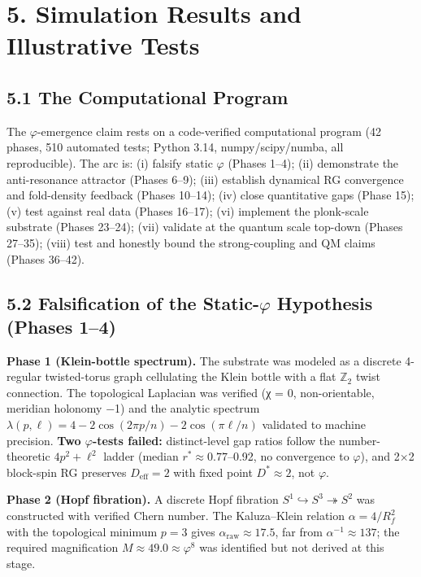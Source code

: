 \documentclass[
  11pt,
]{article}
\begin{document}
\section{5. Simulation Results and Illustrative
Tests}\label{simulation-results-and-illustrative-tests}

\subsection{5.1 The Computational
Program}\label{the-computational-program}

The \(\varphi\)-emergence claim rests on a code-verified computational
program (42 phases, 510 automated tests; Python 3.14, numpy/scipy/numba,
all reproducible). The arc is: (i) falsify static \(\varphi\) (Phases
1--4); (ii) demonstrate the anti-resonance attractor (Phases 6--9);
(iii) establish dynamical RG convergence and fold-density feedback
(Phases 10--14); (iv) close quantitative gaps (Phase 15); (v) test
against real data (Phases 16--17); (vi) implement the plonk-scale
substrate (Phases 23--24); (vii) validate at the quantum scale top-down
(Phases 27--35); (viii) test and honestly bound the strong-coupling and
QM claims (Phases 36--42).

\subsection{\texorpdfstring{5.2 Falsification of the Static-\(\varphi\)
Hypothesis (Phases
1--4)}{5.2 Falsification of the Static-\textbackslash varphi Hypothesis (Phases 1--4)}}\label{falsification-of-the-static-varphi-hypothesis-phases-14}

\textbf{Phase 1 (Klein-bottle spectrum).} The substrate was modeled as a
discrete 4-regular twisted-torus graph cellulating the Klein bottle with
a flat \(\mathbb{Z}_2\) twist connection. The topological Laplacian was
verified (χ = 0, non-orientable, meridian holonomy −1) and the analytic
spectrum \(\lambda(p,\ell) = 4 - 2\cos(2\pi p/n) - 2\cos(\pi\ell/n)\)
validated to machine precision. \textbf{Two \(\varphi\)-tests failed:}
distinct-level gap ratios follow the number-theoretic \(4p^2 + \ell^2\)
ladder (median \(r^* \approx 0.77\)--0.92, no convergence to
\(\varphi\)), and 2×2 block-spin RG preserves \(D_{\text{eff}} = 2\)
with fixed point \(D^* \approx 2\), not \(\varphi\).

\textbf{Phase 2 (Hopf fibration).} A discrete Hopf fibration
\(S^1 \hookrightarrow S^3 \twoheadrightarrow S^2\) was constructed with
verified Chern number. The Kaluza--Klein relation \(\alpha = 4/R_f^2\)
with the topological minimum \(p = 3\) gives
\(\alpha_{\text{raw}} \approx 17.5\), far from
\(\alpha^{-1} \approx 137\); the required magnification
\(M \approx 49.0 \approx \varphi^8\) was identified but not derived at
this stage.
\end{document}
